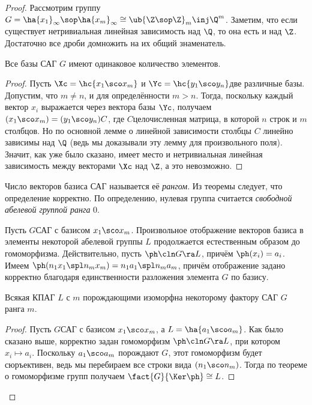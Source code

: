 \documentclass[a4paper]{article}
\newcommand{\kph}{\Ker \ph}
\begin{document}
\begin{proof}
Рассмотрим группу $G=\ha{x_1}_\infty\sop \ha{x_m}_\infty \cong \ub{\Z\sop\Z}_{m} \inj \Q^m$. Заметим, что
если существует нетривиальная линейная зависимость над $\Q$,  то она есть и над $\Z$. Достаточно все дроби
домножить на их общий знаменатель.

\begin{theorem}
Все базы САГ $G$ имеют одинаковое количество элементов.
\end{theorem}
\begin{proof}
Пусть $\Xc=\hc{x_1\sco x_m}$ и $\Yc=\hc{y_1\sco y_n}$\т две различные базы.  Допустим, что $m \neq n$, и для
определённости $m > n$. Тогда, поскольку каждый вектор $x_i$ выражается через вектора базы $\Yc$, получаем
$(x_1\sco x_m)=(y_1\sco y_n)C$, где $C$\т целочисленная матрица, в которой $n$ строк и $m$ столбцов. Но по
основной лемме о линейной зависимости столбцы $C$ линейно зависимы над $\Q$ (ведь мы доказывали эту лемму для
произвольного поля). Значит, как уже было сказано, имеет место и нетривиальная линейная зависимость между
векторами $\Xc$ над $\Z$, а это невозможно.
\end{proof}

\begin{df}
Число векторов базиса САГ называется её \emph{рангом}. Из теоремы следует,  что определение корректно. По
определению, нулевая группа считается \emph{свободной абелевой группой ранга} 0.
\end{df}

Пусть $G$\т САГ с базисом $x_1\sco x_m$. Произвольное отображение векторов  базиса в элементы некоторой
абелевой группы $L$ продолжается естественным образом до гомоморфизма. Действительно, пусть $\ph\cln G \ra L$,
причём $\ph(x_i)=a_i$. Имеем $\ph(n_1x_1 \spl n_mx_m)= n_1a_1 \spl n_ma_m$, причём отображение задано
корректно благодаря единственности разложения элемента $G$ по базису.

\begin{theorem}
Всякая КПАГ $L$ с $m$ порождающими изоморфна некоторому фактору САГ $G$ ранга $m$.
\end{theorem}
\begin{proof}
Пусть $G$\т САГ с базисом $x_1\sco x_m$, а $L=\ha{a_1\sco a_m}$. Как было  сказано выше, корректно задан
гомоморфизм $\ph\cln G \ra L$, при котором $x_i \mapsto a_i$. Поскольку $a_1\sco a_m$ порождают $G$, этот
гомоморфизм будет сюръективен, ведь мы перебираем все строки вида $(n_1\sco n_m)$. Тогда по теореме о
гомоморфизме групп получаем $\fact{G}{\kph} \cong L$.
\end{proof}


\end{proof}
\end{document}
